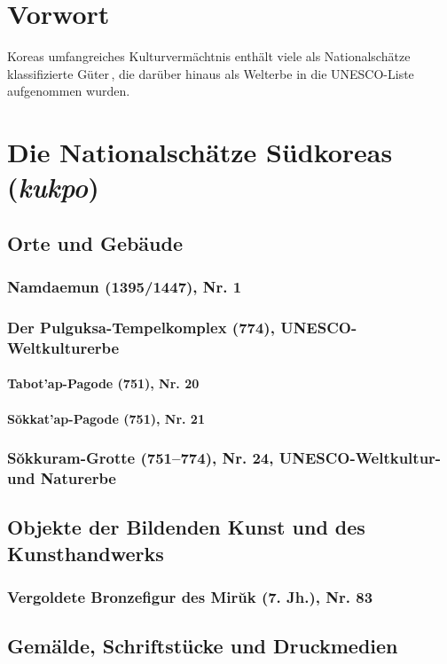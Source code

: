 \documentclass[a4paper,11pt]{scrartcl}%
\begin{document}
\begin{boxedminipage}[t]{\linewidth}
\tableofcontents
\dotfill
\section*{Vorwort}
Koreas umfangreiches Kulturvermächtnis enthält viele als Nationalschätze klassifizierte Güter\,\cite{k1}, die darüber hinaus als Welterbe in die UNESCO-Liste aufgenommen wurden.\cite{k2} 
\section{Die Nationalschätze Südkoreas (\textit{kukpo})}
\subsection{Orte und Gebäude}
\subsubsection{Namdaemun (1395/1447), Nr. 1}
\subsubsection{Der Pulguksa-Tempelkomplex (774), UNESCO-Weltkulturerbe}
\paragraph{Tabot'ap-Pagode (751), Nr. 20} 		%
\paragraph{S\u{o}kkat'ap-Pagode (751), Nr. 21} 	%
\subsubsection{S\u{o}kkuram-Grotte (751--774), Nr. 24, UNESCO-Weltkultur- und Naturerbe}
\subsection{Objekte der Bildenden Kunst und des Kunsthandwerks}
\subsubsection{Vergoldete Bronzefigur des Mir\u{u}k (7. Jh.), Nr. 83}
\subsection{Gemälde, Schriftstücke und Druckmedien}

\end{boxedminipage}
\end{document}
